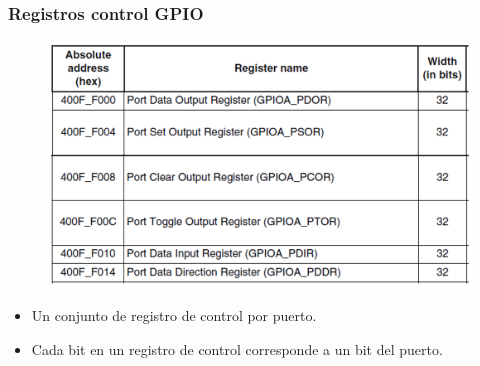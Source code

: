 \documentclass[10.5pt,scale=1.0,t,aspectratio=169,hyperref={pdfpagelabels=false}]{beamer}
\begin{document}
\begin{frame}
	\frametitle{Registros control GPIO}
	\begin{figure}
		\centering
		\includegraphics[scale=0.4]{10_RegistrosControlGPIO}
	\end{figure}
	\begin{itemize}
		\item Un conjunto de registro de control por puerto.
		\item Cada bit en un registro de control corresponde a un bit del puerto. 
	\end{itemize}
\end{frame}
\end{document}
